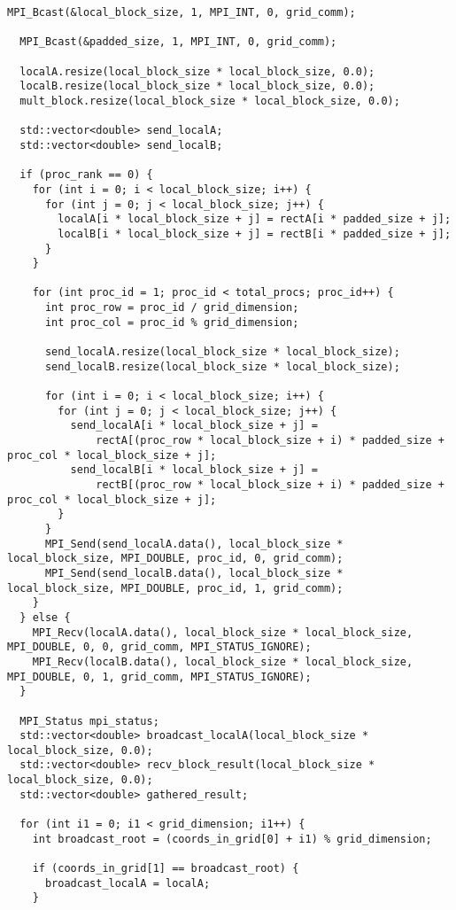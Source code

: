 \documentclass{report}
\begin{document}
\begin{lstlisting}[caption={opsmpi.cpp},label=lst:opsmpi2]
  MPI_Bcast(&local_block_size, 1, MPI_INT, 0, grid_comm);

  MPI_Bcast(&padded_size, 1, MPI_INT, 0, grid_comm);

  localA.resize(local_block_size * local_block_size, 0.0);
  localB.resize(local_block_size * local_block_size, 0.0);
  mult_block.resize(local_block_size * local_block_size, 0.0);

  std::vector<double> send_localA;
  std::vector<double> send_localB;

  if (proc_rank == 0) {
    for (int i = 0; i < local_block_size; i++) {
      for (int j = 0; j < local_block_size; j++) {
        localA[i * local_block_size + j] = rectA[i * padded_size + j];
        localB[i * local_block_size + j] = rectB[i * padded_size + j];
      }
    }

    for (int proc_id = 1; proc_id < total_procs; proc_id++) {
      int proc_row = proc_id / grid_dimension;
      int proc_col = proc_id % grid_dimension;

      send_localA.resize(local_block_size * local_block_size);
      send_localB.resize(local_block_size * local_block_size);

      for (int i = 0; i < local_block_size; i++) {
        for (int j = 0; j < local_block_size; j++) {
          send_localA[i * local_block_size + j] =
              rectA[(proc_row * local_block_size + i) * padded_size + proc_col * local_block_size + j];
          send_localB[i * local_block_size + j] =
              rectB[(proc_row * local_block_size + i) * padded_size + proc_col * local_block_size + j];
        }
      }
      MPI_Send(send_localA.data(), local_block_size * local_block_size, MPI_DOUBLE, proc_id, 0, grid_comm);
      MPI_Send(send_localB.data(), local_block_size * local_block_size, MPI_DOUBLE, proc_id, 1, grid_comm);
    }
  } else {
    MPI_Recv(localA.data(), local_block_size * local_block_size, MPI_DOUBLE, 0, 0, grid_comm, MPI_STATUS_IGNORE);
    MPI_Recv(localB.data(), local_block_size * local_block_size, MPI_DOUBLE, 0, 1, grid_comm, MPI_STATUS_IGNORE);
  }

  MPI_Status mpi_status;
  std::vector<double> broadcast_localA(local_block_size * local_block_size, 0.0);
  std::vector<double> recv_block_result(local_block_size * local_block_size, 0.0);
  std::vector<double> gathered_result;

  for (int i1 = 0; i1 < grid_dimension; i1++) {
    int broadcast_root = (coords_in_grid[0] + i1) % grid_dimension;

    if (coords_in_grid[1] == broadcast_root) {
      broadcast_localA = localA;
    }


\end{lstlisting}
\end{document}
